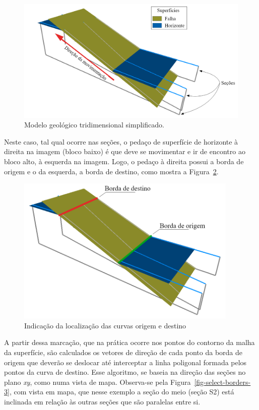 \begin{figure} [H]
  \begin{center}
    \includegraphics[width=350pt]{images/fig-select-borders-1}
    \caption{Modelo geológico tridimensional simplificado.}\label{fig-select-borders-1}
  \end{center}
\end{figure}

Neste caso, tal qual ocorre nas seções, o pedaço de superfície de horizonte à direita na imagem (bloco baixo) é que deve se movimentar e ir de encontro ao bloco alto, à esquerda na imagem. Logo, o pedaço à direita possui a borda de origem e o da esquerda, a borda de destino, como mostra a Figura~\ref{fig-select-borders-2}.

\begin{figure} [H]
  \begin{center}
    \includegraphics[width=300pt]{images/fig-select-borders-2}
    \caption{Indicação da localização das curvas origem e destino}\label{fig-select-borders-2}
  \end{center}
\end{figure}

A partir dessa marcação, que na prática ocorre nos pontos do contorno da malha da superfície, são calculados os vetores de direção de cada ponto da borda de origem que deverão se deslocar até interceptar a linha poligonal formada pelos pontos da curva de destino. Esse algoritmo, se baseia na direção das seções no plano \textit{xy}, como numa vista de mapa. Observa-se pela Figura~\ref{fig-select-borders-3}, com vista em mapa, que nesse exemplo a seção do meio (seção S2) está inclinada em relação às outras seções que são paralelas entre si.

